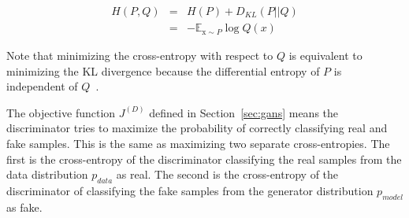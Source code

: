 \documentclass[twocolumn]{article}
\numberwithin{equation}{section}
\begin{document}
\begin{eqnarray}
    H(P,Q) &=& H(P) + D_{KL}(P||Q) \nonumber \\
           &=& -\mathbb{E}_{\text{x}\sim P} \log Q(x)
\end{eqnarray}

Note that minimizing the cross-entropy with respect to $Q$ is equivalent to minimizing the KL divergence because the 
differential entropy of $P$ is independent of $Q$~\cite{gf_book}. 

The objective function $J^{(D)}$ defined in Section~\ref{sec:gans} means the discriminator tries to maximize the 
probability of correctly classifying real and fake samples. This is the same as maximizing two separate cross-entropies. 
The first is the cross-entropy of the discriminator classifying the real samples from the data distribution $p_{data}$ as 
real. The second is the cross-entropy of the discriminator of classifying the fake samples from the generator distribution
$p_{model}$ as fake. 




\end{document}

